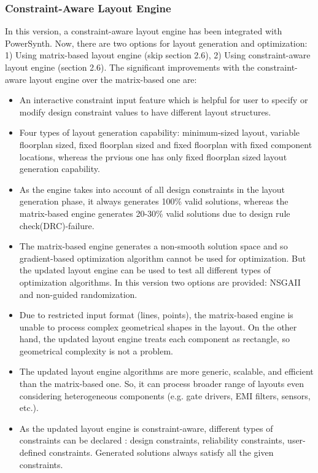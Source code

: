 \documentclass[11pt]{article}
\begin{document}
\subsubsection{Constraint-Aware Layout Engine}
In this version, a constraint-aware layout engine has been integrated with PowerSynth. Now, there are two options for layout generation and optimization: 1) Using matrix-based layout engine (skip section 2.6), 2) Using constraint-aware layout engine (section 2.6). The significant improvements with the constraint-aware layout engine over the matrix-based one are: 
\begin{itemize}
    \item An interactive constraint input feature which is helpful for user to specify or modify design constraint values to have different layout structures.
    \item Four types of layout generation capability: minimum-sized layout, variable floorplan sized, fixed floorplan sized and fixed floorplan with fixed component locations, whereas the prvious one has only fixed floorplan sized layout generation capability.
    \item As the engine takes into account of all design constraints in the layout generation phase, it always generates 100\% valid solutions, whereas the matrix-based engine generates 20-30\% valid solutions due to design rule check(DRC)-failure.
    \item The matrix-based engine generates a non-smooth solution space and so gradient-based optimization algorithm cannot be used for optimization. But the updated layout engine can be used to test all different types of optimization algorithms. In this version two options are provided: NSGAII and non-guided randomization.
    \item Due to restricted input format (lines, points), the matrix-based engine is unable to process complex geometrical shapes in the layout. On the other hand, the updated layout engine treats each component as rectangle, so geometrical complexity is not a problem.
    \item The updated layout engine algorithms are more generic, scalable, and efficient than the matrix-based one. So, it can process broader range of layouts even considering heterogeneous components (e.g. gate drivers, EMI filters, sensors, etc.).
    \item As the updated layout engine is constraint-aware, different types of constraints can be declared : design constraints, reliability constraints, user-defined constraints. Generated solutions always satisfy all the given constraints.

\end{itemize}
\end{document}
